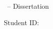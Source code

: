 \begin{titlepage}
    \centering
    \vspace*{2cm}

    {\Large \thesisdept \par}
    \vspace{0.5cm}
    {\large \thesismodule \ -- Dissertation \par}

    \vspace{3cm}
    {\huge \bfseries \thesistitle \par}

    \vspace{2cm}
    {\large \thesisauthor \par}
    {\large Student ID: \thesisid \par}

    \vfill

    {\large \thesisdate \par}

\end{titlepage}
